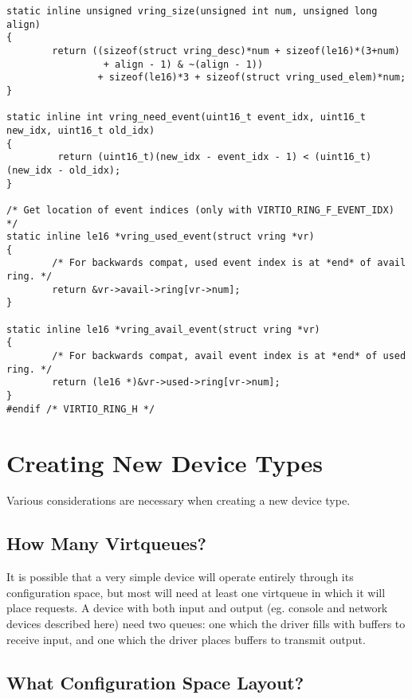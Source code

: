 \begin{lstlisting}
static inline unsigned vring_size(unsigned int num, unsigned long align)
{
        return ((sizeof(struct vring_desc)*num + sizeof(le16)*(3+num)
                 + align - 1) & ~(align - 1))
                + sizeof(le16)*3 + sizeof(struct vring_used_elem)*num;
}

static inline int vring_need_event(uint16_t event_idx, uint16_t new_idx, uint16_t old_idx)
{
         return (uint16_t)(new_idx - event_idx - 1) < (uint16_t)(new_idx - old_idx);
}

/* Get location of event indices (only with VIRTIO_RING_F_EVENT_IDX) */
static inline le16 *vring_used_event(struct vring *vr)
{
        /* For backwards compat, used event index is at *end* of avail ring. */
        return &vr->avail->ring[vr->num];
}

static inline le16 *vring_avail_event(struct vring *vr)
{
        /* For backwards compat, avail event index is at *end* of used ring. */
        return (le16 *)&vr->used->ring[vr->num];
}
#endif /* VIRTIO_RING_H */
\end{lstlisting}



\chapter{Creating New Device Types}\label{sec:Creating New Device Types}

Various considerations are necessary when creating a new device
type.

\section{How Many Virtqueues?}\label{sec:Creating New Device Types / How Many Virtqueues?}

It is possible that a very simple device will operate entirely
through its configuration space, but most will need at least one
virtqueue in which it will place requests. A device with both
input and output (eg. console and network devices described here)
need two queues: one which the driver fills with buffers to
receive input, and one which the driver places buffers to
transmit output.

\section{What Configuration Space Layout?}\label{sec:Creating New Device Types / What Configuration Space Layout?}

